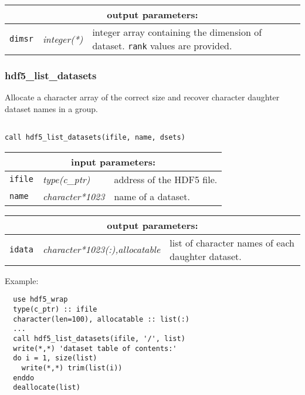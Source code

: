 \vskip 0.8cm

\noindent
\begin{tabular}{|p{1.5cm}|p{3cm}|p{10cm}|}
\hline
\multicolumn{3}{|c|}{\bf output parameters:} \\
\hline
{\tt dimsr} & {\it integer(*)} & integer array containing the dimension of dataset. {\tt rank} values are provided. \\
\hline
\end{tabular}

\subsubsection{hdf5\_list\_datasets}

Allocate a character array of the correct size and recover character daughter dataset names in a group.

\begin{verbatim}

call hdf5_list_datasets(ifile, name, dsets)
\end{verbatim}

\noindent
\begin{tabular}{|p{1.5cm}|p{3cm}|p{10cm}|}
\hline
\multicolumn{3}{|c|}{\bf input parameters:} \\
\hline
{\tt ifile} & {\it type(c\_ptr)} & address of the HDF5 file. \\
\hline
{\tt name} & {\it character*1023} & name of a dataset. \\
\hline
\end{tabular}

\vskip 0.8cm

\noindent
\begin{tabular}{|p{1.5cm}|p{4.5cm}|p{8.5cm}|}
\hline
\multicolumn{3}{|c|}{\bf output parameters:} \\
\hline
{\tt idata} & {\it character*1023(:),allocatable} & list of character names of each daughter dataset.\\
\hline
\end{tabular}

\vskip 0.5cm

\noindent Example:
\begin{verbatim}
  use hdf5_wrap
  type(c_ptr) :: ifile
  character(len=100), allocatable :: list(:)
  ...
  call hdf5_list_datasets(ifile, '/', list)
  write(*,*) 'dataset table of contents:'
  do i = 1, size(list)
    write(*,*) trim(list(i))
  enddo
  deallocate(list)
\end{verbatim}

